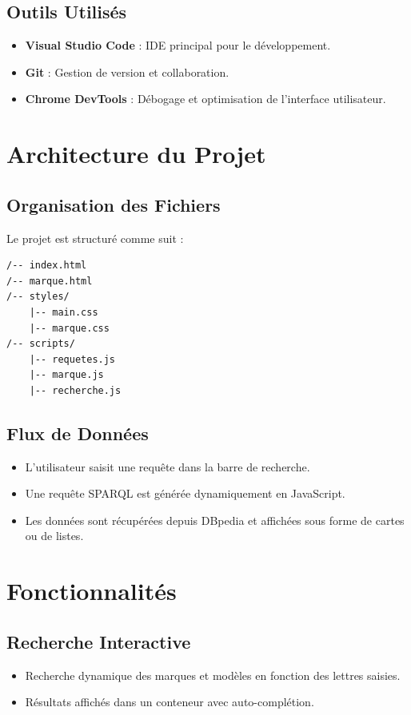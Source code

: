 \documentclass[a4paper]{article}
\begin{document}
\subsection{Outils Utilisés}
\begin{itemize}
    \item \textbf{Visual Studio Code} : IDE principal pour le développement.
    \item \textbf{Git} : Gestion de version et collaboration.
    \item \textbf{Chrome DevTools} : Débogage et optimisation de l'interface utilisateur.
\end{itemize}

\newpage

\section{Architecture du Projet}
\subsection{Organisation des Fichiers}
Le projet est structuré comme suit :
\begin{verbatim}
/-- index.html
/-- marque.html
/-- styles/
    |-- main.css
    |-- marque.css
/-- scripts/
    |-- requetes.js
    |-- marque.js
    |-- recherche.js
\end{verbatim}

\subsection{Flux de Données}
\begin{itemize}
    \item L'utilisateur saisit une requête dans la barre de recherche.
    \item Une requête SPARQL est générée dynamiquement en JavaScript.
    \item Les données sont récupérées depuis DBpedia et affichées sous forme de cartes ou de listes.
\end{itemize}

\newpage

\section{Fonctionnalités}
\subsection{Recherche Interactive}
\begin{itemize}
    \item Recherche dynamique des marques et modèles en fonction des lettres saisies.
    \item Résultats affichés dans un conteneur avec auto-complétion.
\end{itemize}
\end{document}
